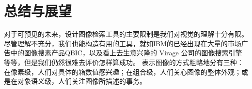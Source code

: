 
\section{总结与展望}

对于可预见的未来，设计图像检索工具的主要限制是我们对视觉的理解十分有限。尽管理解不充分，我们也能构造有用的工具，就如IBM的已经出现在大量的市场广告中的图像搜素产品QBIC，以及看上去生意兴隆的
Virage 公司的图像搜索引擎等等，但是我们仍然很难去评价怎样算成功。
表示图像的方式粗略地分有三种：在像素级，人们对具体的箱数值感兴趣；在组合级，人们关心图像的整体外观；或是在对象语义级，人们关注图像所描述的事务。
